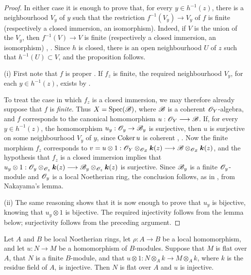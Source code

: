 \begin{proof}
In either case it is enough to prove that, for every
$y\in h^{-1}(z)$, there is a neighbourhood $V_y$ of $y$ such that
the restriction $f^{-1}(V_y)\longrightarrow V_y$
of $f$ is finite (respectively a closed immersion, an isomorphism).
Indeed, if $V$ is the union of the $V_y$, then
$f^{-1}(V)\to V$ is finite (respectively a closed immersion, an
isomorphism) , .  Since $h$ is
closed, there is an open neighbourhood $U$ of $z$ such that
$h^{-1}(U)\subset V$, and the proposition follows.

\noindent (i) First note that $f$ is proper
.  If
$f_z$ is finite, the required neighbourhood $V_y$, for each
$y\in h^{-1}(z)$, exists by .


To treat the case in which $f_z$ is a closed immersion, we may
therefore already suppose that $f$ is \emph{finite}.  Thus
$X=\operatorname{Spec}(\mathscr{B})$, where $\mathscr{B}$ is a coherent
$\mathscr{O}_Y$-algebra, and $f$ corresponds  to the
canonical homomorphism $u:\mathscr{O}_Y\longrightarrow\mathscr{B}$.
If, for every $y\in h^{-1}(z)$, the homomorphism
$u_y:\mathscr{O}_y\to\mathscr{B}_y$ is surjective, then $u$ is surjective on
some neighbourhood $V_y$ of $y$, since $\operatorname{Coker} u$ is coherent
, .  Now the finite morphism
$f_z$ corresponds to $v=u\otimes1:
\mathscr{O}_Y\otimes_{\mathscr{O}_Z}\boldsymbol{k}(z)
\longrightarrow
\mathscr{B}\otimes_{\mathscr{O}_Z}\boldsymbol{k}(z)$,
and the hypothesis that $f_z$ is a closed immersion implies that $u_y\otimes1:
\mathscr{O}_y\otimes_{\mathscr{O}_z}\boldsymbol{k}(z)
\longrightarrow
\mathscr{B}_y\otimes_{\mathscr{O}_z}\boldsymbol{k}(z)$
is surjective.  Since $\mathscr{B}_y$ is a finite $\mathscr{O}_y$-module and
$\mathscr{O}_y$ is a local Noetherian ring, the conclusion follows, as
in , from Nakayama's lemma.

\noindent (ii) The same reasoning shows that it is now
enough to prove
that $u_y$ is bijective, knowing that $u_y\otimes1$ is bijective.
The required injectivity follows from the lemma below; surjectivity
follows from the preceding argument.
\end{proof}

\begin{lemma}[4.6.7.1]
\label{III.4.6.7.1}
Let $A$ and $B$ be local Noetherian rings, let
$\rho:A\to B$ be a local homomorphism, and let $u:N\to M$ be a
homomorphism of $B$-modules.  Suppose that $M$ is flat over $A$,
that $N$ is a finite $B$-module, and that $u\otimes1:
N\otimes_A k\longrightarrow M\otimes_A k$,
where $k$ is the residue field of $A$, is injective.  Then $N$ is
flat over $A$ and $u$ is injective.
\end{lemma}

